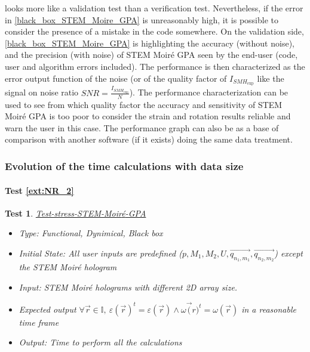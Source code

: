 \documentclass[12pt, titlepage]{article}
\newcommand{\progname}{STEM Moir{\'e} GPA}
\newtheorem{Test}{Test}
\begin{document}
 looks more like a validation test than a verification test. Nevertheless, if the error in \cref{black_box_STEM_Moire_GPA} is unreasonably high, it is possible to consider the presence of a mistake in the code somewhere. On the validation side, \cref{black_box_STEM_Moire_GPA} is highlighting the accuracy (without noise), and the precision (with noise) of \progname{} seen by the end-user (code, user and algorithm errors included). The performance is then characterized as the error output function of the noise (or of the quality factor of $I_{\mathit{SMH}_{\text{exp}}}$ like the signal on noise ratio $\mathit{SNR}=\frac{I_{\mathit{SMH}_\text{exp}}}{N}$). The performance characterization can be used to see from which quality factor the accuracy and sensitivity of \progname{} is too poor to consider the strain and rotation results reliable and warn the user in this case. The performance graph can also be as a base of comparison with another software (if it exists) doing the same data treatment.

\subsubsection{Evolution of the time calculations with data size}
		
\paragraph{Test \cref{ext:NR_2}}

\begin{Test}\normalfont\underline{Test-stress-STEM-Moir{\'e}-GPA}
\label{stress_test_STEM_Moire_GPA}
\begin{itemize}
\item Type: Functional, Dynimical, Black box
\item Initial State: All user inputs are predefined ($p,M_1,M_2,U,\overrightarrow{q_{n_1,m_1}},\overrightarrow{q_{n_2,m_2}}$) except the STEM Moir{\'e} hologram
\item Input: STEM Moir{\'e} holograms with different 2D array size.
\item Expected output $\forall \vec{r} \in \mathbb{I}, \ \varepsilon(\vec{r})^{t}=\varepsilon(\vec{r}) \wedge \omega\vec({r})^{t}=\omega(\vec{r})$ in a reasonable time frame
\item Output: Time to perform all the calculations
\end{itemize}
\end{Test}
\end{document}

